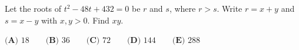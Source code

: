 Let the roots of \(t^2-48t+432=0\) be \(r\) and \(s\), where \(r>s\). Write \(r=x+y\) and \(s=x-y\) with \(x,y>0\). Find \(xy\).

\(\textbf{(A) } 18 \qquad\textbf{(B) } 36 \qquad\textbf{(C) } 72 \qquad\textbf{(D) } 144 \qquad\textbf{(E) } 288\)
